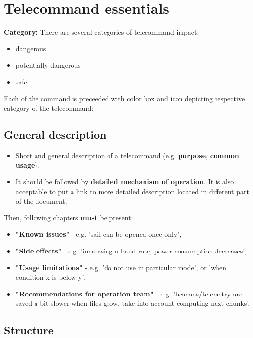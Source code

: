 \section{Telecommand essentials}

\textbf{Category:} There are several categories of telecommand impact:
\begin{itemize}
    \item dangerous
    \item potentially dangerous
    \item safe
\end{itemize}

Each of the command is preceeded with color box and icon depicting respective category of the telecommand:
\vspace{1em}
\vspace{1em}
\vspace{1em}

\subsection{General description}
\begin{itemize}
    \item Short and general description of a telecommand (e.g. \textbf{purpose}, \textbf{common usage}).
    \item It should be followed by \textbf{detailed mechanism of operation}. It is also acceptable to put a link to more detailed description located in different part of the document.
\end{itemize}

Then, following chapters \textbf{must} be present:
\begin{itemize}
    \item \textbf{"Known issues"} - e.g. 'sail can be opened once only',
    \item \textbf{"Side effects"} - e.g. 'increasing a baud rate, power consumption decreases',
    \item \textbf{"Usage limitations"} - e.g. 'do not use in particular mode', or 'when condition x is below y',
    \item \textbf{"Recommendations for operation team"} - e.g. 'beacons/telemetry are saved a bit slower when files grow, take into account computing next chunks'.
\end{itemize}

\subsection{Structure}

